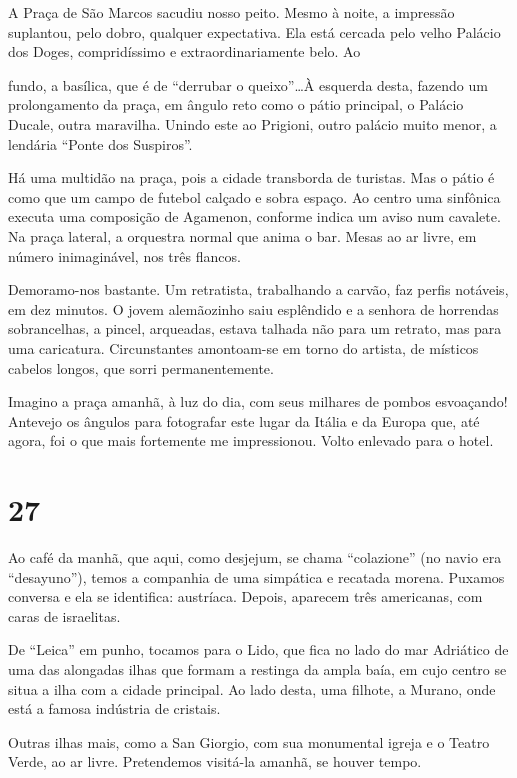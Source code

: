 A Praça de São Marcos sacudiu nosso peito. Mesmo à noite, a impressão suplantou, pelo dobro, qualquer expectativa. Ela está cercada pelo velho Palácio dos Doges, compridíssimo e extraordinariamente belo. Ao

fundo, a basílica, que é de “derrubar o queixo”\ldots À esquerda desta, fazendo um prolongamento da praça, em ângulo reto como o pátio principal, o Palácio Ducale, outra maravilha. Unindo este ao Prigioni, outro palácio muito menor, a lendária “Ponte dos Suspiros”.

Há uma multidão na praça, pois a cidade transborda de turistas. Mas o pátio é como que um campo de futebol calçado e sobra espaço. Ao centro uma sinfônica executa uma composição de Agamenon, conforme indica um aviso num cavalete. Na praça lateral, a orquestra normal que anima o bar. Mesas ao ar livre, em número inimaginável, nos três flancos.

Demoramo-nos bastante. Um retratista, trabalhando a carvão, faz perfis notáveis, em dez minutos. O jovem alemãozinho saiu esplêndido e a senhora de horrendas sobrancelhas, a pincel, arqueadas, estava talhada não para um retrato, mas para uma caricatura. Circunstantes amontoam-se em torno do artista, de místicos cabelos longos, que sorri permanentemente.

Imagino a praça amanhã, à luz do dia, com seus milhares de pombos esvoaçando! Antevejo os ângulos para fotografar este lugar da Itália e da Europa que, até agora, foi o que mais fortemente me impressionou. Volto enlevado para o hotel.

\section*{27 \adfflatleafright {}}
Ao café da manhã, que aqui, como desjejum, se chama “colazione” (no navio era “desayuno”), temos a companhia de uma simpática e recatada morena. Puxamos conversa e ela se identifica: austríaca. Depois, aparecem três americanas, com caras de israelitas.

De “Leica” em punho, tocamos para o Lido, que fica no lado do mar Adriático de uma das alongadas ilhas que formam a restinga da ampla baía, em cujo centro se situa a ilha com a cidade principal. Ao lado desta, uma filhote, a Murano, onde está a famosa indústria de cristais.

Outras ilhas mais, como a San Giorgio, com sua monumental igreja e o Teatro Verde, ao ar livre. Pretendemos visitá-la amanhã, se houver tempo.

